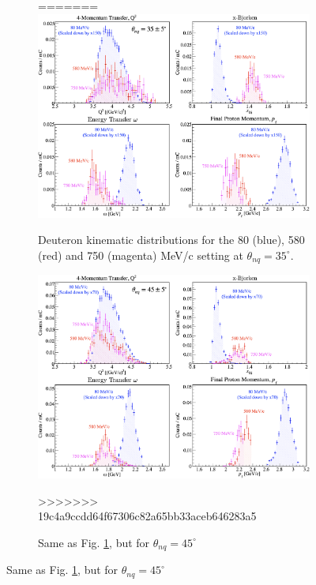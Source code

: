 \documentclass[aps, prl]{revtex4-2}  %
\providecommand{\DIFaddbeginFL}{} %
\providecommand{\DIFaddendFL}{} %
\providecommand{\DIFdelbeginFL}{} %
\providecommand{\DIFdelendFL}{} %
\newcommand{\DIFscaledelfig}{0.5}
\newlength{\DIFdelgraphicswidth} %
\newlength{\DIFdelgraphicsheight} %
\newcommand{\DIFaddincludegraphics}[2][]{{\color{blue}\fbox{\DIFOincludegraphics[#1]{#2}}}} %
\newcommand{\DIFdelincludegraphics}[2][]{%
\sbox{\DIFdelgraphicsbox}{\DIFOincludegraphics[#1]{#2}}%
\settoboxwidth{\DIFdelgraphicswidth}{\DIFdelgraphicsbox} %
\settoboxtotalheight{\DIFdelgraphicsheight}{\DIFdelgraphicsbox} %
\scalebox{\DIFscaledelfig}{%
\parbox[b]{\DIFdelgraphicswidth}{\usebox{\DIFdelgraphicsbox}\\[-\baselineskip] \rule{\DIFdelgraphicswidth}{0em}}\llap{\resizebox{\DIFdelgraphicswidth}{\DIFdelgraphicsheight}{%
\setlength{\unitlength}{\DIFdelgraphicswidth}%
\begin{picture}(1,1)%
\thicklines\linethickness{2pt} %
{\color[rgb]{1,0,0}\put(0,0){\framebox(1,1){}}}%
{\color[rgb]{1,0,0}\put(0,0){\line( 1,1){1}}}%
{\color[rgb]{1,0,0}\put(0,1){\line(1,-1){1}}}%
\end{picture}%
}\hspace*{3pt}}} %
} %
\DeclareRobustCommand{\DIFaddbeginFL}{\DIFOaddbeginFL \let\includegraphics\DIFaddincludegraphics} %
\DeclareRobustCommand{\DIFaddendFL}{\DIFOaddendFL \let\includegraphics\DIFOincludegraphics} %
\DeclareRobustCommand{\DIFdelbeginFL}{\DIFOdelbeginFL \let\includegraphics\DIFdelincludegraphics} %
\DeclareRobustCommand{\DIFdelendFL}{\DIFOaddendFL \let\includegraphics\DIFOincludegraphics} %
\begin{document}
\begin{figure}[!h]
\begin{figure}[!h]
\caption{Same as Fig. \ref{fig:d2_kin_35deg}, but for $\theta_{nq}=45^{\circ}$}
=======
\DIFdelbeginFL %
\DIFdelendFL \DIFaddbeginFL \includegraphics[scale=0.17]{plots/d2_kin_thnq35.png}
\DIFaddendFL \caption{Deuteron kinematic distributions for the 80 (blue), 580 (red) and 750 (magenta) MeV/c setting at $\theta_{nq}=35^{\circ}$.}
\label{fig:d2_kin_35deg}
\end{figure}
\begin{figure}[!h]
\DIFdelbeginFL %
\DIFdelendFL \DIFaddbeginFL \includegraphics[scale=0.17]{plots/d2_kin_thnq45.png}
\DIFaddendFL \caption{Same as Fig. \ref{fig:d2_kin_35deg}, but for $\theta_{nq}=45^{\circ}$}
>>>>>>> 19c4a9ccdd64f67306c82a65bb33aceb646283a5
\label{fig:d2_kin_45deg}
\end{figure}

\end{figure}
\end{document}
